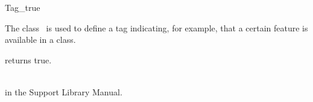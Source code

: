 \begin{ccRefClass}{Tag_true}

\ccDefinition

The class \ccRefName\ is used to define a tag indicating, for example,
that a certain feature is available in a class.


{returns true.}

\ccSeeAlso
{} \\
 in the Support Library Manual.

\end{ccRefClass}

